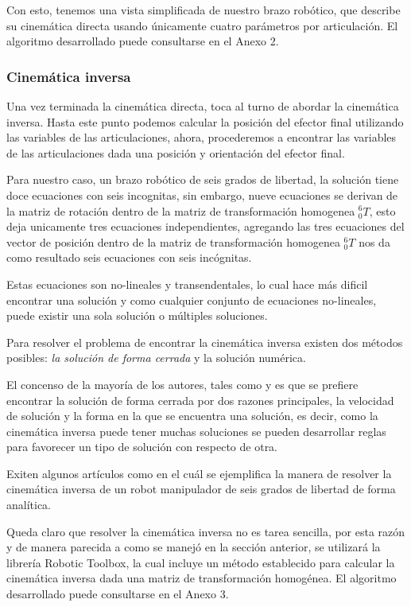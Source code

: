 Con esto, tenemos una vista simplificada de nuestro brazo robótico, que describe su cinemática directa usando únicamente cuatro parámetros por articulación. El algoritmo desarrollado puede consultarse en el Anexo 2.	

\subsubsection{Cinemática inversa}

Una vez terminada la cinemática directa, toca al turno de abordar la cinemática inversa. Hasta este punto podemos calcular la posición del efector final utilizando las variables de las articulaciones, ahora, procederemos a encontrar las variables de las articulaciones dada una posición y orientación del efector final.

Para nuestro caso, un brazo robótico de seis grados de libertad, la solución tiene doce ecuaciones con seis incognitas, sin embargo, nueve ecuaciones se derivan de la matriz de rotación dentro de la matriz de transformación homogenea ${}_{0}^{6}T$, esto deja unicamente tres ecuaciones independientes, agregando las tres ecuaciones del vector de posición dentro de la matriz de transformación homogenea ${}_{0}^{6}T$ nos da como resultado seis ecuaciones con seis incógnitas.	

Estas ecuaciones son no-lineales y transendentales, lo cual hace más dificil encontrar una solución y como cualquier conjunto de ecuaciones no-lineales, puede existir una sola solución o múltiples soluciones. \cite{Craig2013}

Para resolver el problema de encontrar la cinemática inversa existen dos métodos posibles: \textit{la solución de forma cerrada} y la solución numérica. 

El concenso de la mayoría de los autores, tales como \cite{Spong2005} y \cite{Craig2013} es que se prefiere encontrar la solución de forma cerrada por dos razones principales, la velocidad de solución y la forma en la que se encuentra una solución, es decir, como la cinemática inversa puede tener muchas soluciones se pueden desarrollar reglas para favorecer un tipo de solución con respecto de otra.

Exiten algunos artículos como \cite{Chen2017} en el cuál se ejemplifica la manera de resolver la cinemática inversa de un robot manipulador de seis grados de libertad de forma analítica.

Queda claro que resolver la cinemática inversa no es tarea sencilla, por esta razón y de manera parecida a como se manejó en la sección anterior, se utilizará la librería Robotic Toolbox, la cual incluye un método establecido para calcular la cinemática inversa dada una matriz de transformación homogénea. El algoritmo desarrollado puede consultarse en el Anexo 3.

